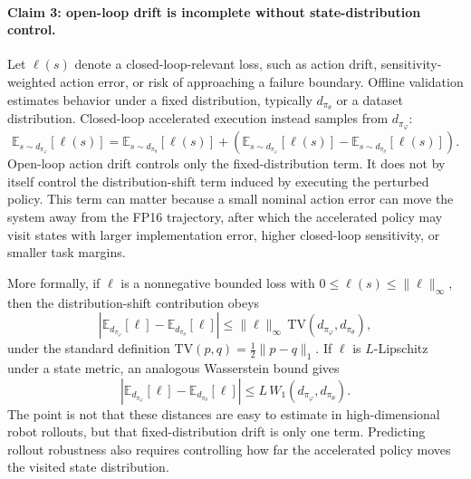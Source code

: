 \documentclass[10pt]{article}
\begin{document}
\paragraph{Claim 3: open-loop drift is incomplete without state-distribution control.}
Let $\ell(s)$ denote a closed-loop-relevant loss, such as action drift, sensitivity-weighted action error, or risk of approaching a failure boundary. Offline validation estimates behavior under a fixed distribution, typically $d_{\pi_\theta}$ or a dataset distribution. Closed-loop accelerated execution instead samples from $d_{\pi_\varphi}$:
\begin{equation}
    \mathbb{E}_{s\sim d_{\pi_\varphi}}[\ell(s)]
    =
    \mathbb{E}_{s\sim d_{\pi_\theta}}[\ell(s)]
    +
    \left(
    \mathbb{E}_{s\sim d_{\pi_\varphi}}[\ell(s)]
    -
    \mathbb{E}_{s\sim d_{\pi_\theta}}[\ell(s)]
    \right).
    \label{eq:distribution-shift-decomposition}
\end{equation}
Open-loop action drift controls only the fixed-distribution term. It does not by itself control the distribution-shift term induced by executing the perturbed policy. This term can matter because a small nominal action error can move the system away from the FP16 trajectory, after which the accelerated policy may visit states with larger implementation error, higher closed-loop sensitivity, or smaller task margins.

More formally, if $\ell$ is a nonnegative bounded loss with $0\le \ell(s)\le \|\ell\|_\infty$, then the distribution-shift contribution obeys
\begin{equation}
    \left|
    \mathbb{E}_{d_{\pi_\varphi}}[\ell]
    -
    \mathbb{E}_{d_{\pi_\theta}}[\ell]
    \right|
    \le
    \|\ell\|_\infty\,
    \mathrm{TV}(d_{\pi_\varphi},d_{\pi_\theta}),
\end{equation}
under the standard definition $\mathrm{TV}(p,q)=\frac{1}{2}\|p-q\|_1$. If $\ell$ is $L$-Lipschitz under a state metric, an analogous Wasserstein bound gives
\begin{equation}
    \left|
    \mathbb{E}_{d_{\pi_\varphi}}[\ell]
    -
    \mathbb{E}_{d_{\pi_\theta}}[\ell]
    \right|
    \le
    L\,W_1(d_{\pi_\varphi},d_{\pi_\theta}).
\end{equation}
The point is not that these distances are easy to estimate in high-dimensional robot rollouts, but that fixed-distribution drift is only one term. Predicting rollout robustness also requires controlling how far the accelerated policy moves the visited state distribution.
\end{document}
